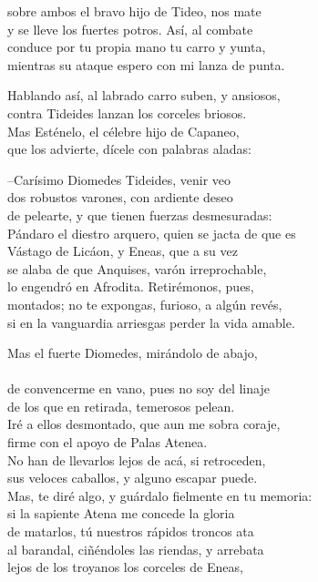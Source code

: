 sobre ambos el bravo hijo de Tideo, nos mate\\
y se lleve los fuertes potros. Así, al combate\\
conduce por tu propia mano tu carro y yunta,\\
mientras su ataque espero con mi lanza de punta.\par
Hablando así, al labrado carro suben, y ansiosos,\\
contra Tideides lanzan los corceles briosos.\\
Mas Esténelo, el célebre hijo de Capaneo,\\
que los advierte, dícele con palabras aladas:\par
--Carísimo Diomedes Tideides, venir veo\\
dos robustos varones, con ardiente deseo\\
de pelearte, y que tienen fuerzas desmesuradas:\\
Pándaro el diestro arquero, quien se jacta de que es\\
Vástago de Licáon, y Eneas, que a su vez\\
se alaba de que Anquises, varón irreprochable,\\
lo engendró en Afrodita. Retirémonos, pues,\\
montados; no te expongas, furioso, a algún revés,\\
si en la vanguardia arriesgas perder la vida amable.\par
Mas el fuerte Diomedes, mirándolo de abajo,\\
\\
de convencerme en vano, pues no soy del linaje\\
de los que en retirada, temerosos pelean.\\
Iré a ellos desmontado, que aun me sobra coraje,\\
firme con el apoyo de Palas Atenea.\\
No han de llevarlos lejos de acá, si retroceden,\\
sus veloces caballos, y alguno escapar puede.\\
Mas, te diré algo, y guárdalo fielmente en tu memoria:\\
si la sapiente Atena me concede la gloria\\
de matarlos, tú nuestros rápidos troncos ata\\
al barandal, ciñéndoles las riendas, y arrebata\\
lejos de los troyanos los corceles de Eneas,\\
